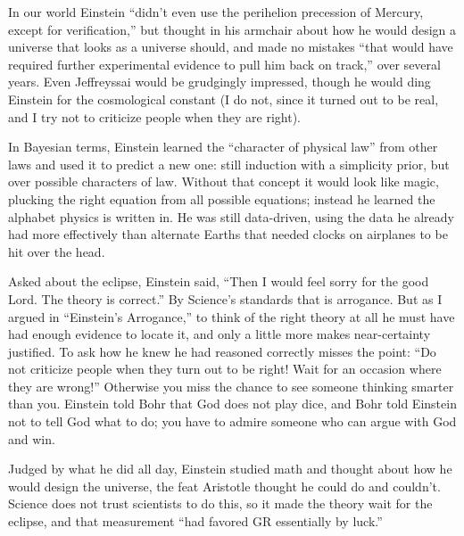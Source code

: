 In our world Einstein ``didn't even use the perihelion precession of Mercury, except for verification,'' but thought in his armchair about how he would design a universe that looks as a universe should, and made no mistakes ``that would have required further experimental evidence to pull him back on track,'' over several years. Even Jeffreyssai would be grudgingly impressed, though he would ding Einstein for the cosmological constant (I do not, since it turned out to be real, and I try not to criticize people when they are right). 

In Bayesian terms, Einstein learned the ``character of physical law'' from other laws and used it to predict a new one: still induction with a simplicity prior, but over possible characters of law. Without that concept it would look like magic, plucking the right equation from all possible equations; instead he learned the alphabet physics is written in. He was still data-driven, using the data he already had more effectively than alternate Earths that needed clocks on airplanes to be hit over the head. 

Asked about the eclipse, Einstein said, ``Then I would feel sorry for the good Lord. The theory is correct.'' By Science's standards that is arrogance. But as I argued in ``Einstein's Arrogance,'' to think of the right theory at all he must have had enough evidence to locate it, and only a little more makes near-certainty justified. To ask how he knew he had reasoned correctly misses the point: ``Do not criticize people when they turn out to be right! Wait for an occasion where they are wrong!'' Otherwise you miss the chance to see someone thinking smarter than you.  Einstein told Bohr that God does not play dice, and Bohr told Einstein not to tell God what to do; you have to admire someone who can argue with God and win. 

Judged by what he did all day, Einstein studied math and thought about how he would design the universe, the feat Aristotle thought he could do and couldn't. Science does not trust scientists to do this, so it made the theory wait for the eclipse, and that measurement ``had favored GR essentially by luck.'' 

